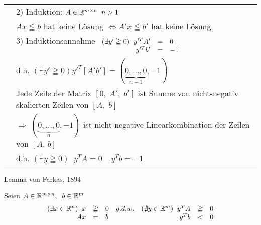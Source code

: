 \begin{longtable}[l]{lp{13cm}}
&2) Induktion: $A \in \mathbb{R}^{m \times n} \; \; n > 1 $\\
& $A x \leqq b$ hat keine Lösung $\Leftrightarrow A'x \leqq b'$ hat keine Lösung\\
& 3) Induktionsannahme $\begin{array}[t]{rcl}(\exists y' \geqq 0) 
\; \; y'^{T}A' &=& 0\\ y'^{T}b'&=&-1\end{array}$\\
&d.h.  $(\exists y' \geqq 0) y'^{T} [A'b'] =
(\underbrace{0,\ldots,0}_{n-1},-1) $\\
&Jede Zeile der Matrix $[0,\;A',\;b']$ ist Summe von nicht-negativ skalierten
Zeilen von $[A,\; b]$\\
&$\Rightarrow \; (\underbrace{0,\ldots,0}_{n},-1)$ ist nicht-negative
Linearkombination der Zeilen von $[A, \, b]$\\
&d.h. $(\exists y \geqq 0) \;\; y^{T} A = 0\; \; \; \; y^{T}b = -1$
\end{longtable}

\begin{korollar}
Lemma von Farkas, 1894

Seien $A\in \mathbb{R}^{m\times n}, \; \; b \in \mathbb{R}^{m}$
\[\begin{array}{rcllrcl}
(\exists x \in \mathbb{R}^{n}) \; \; x &\geqq& 0 & g.d.w. & (\nexists y \in
\mathbb{R}^{m}) \; \; y^{T}A &\geqq& 0\\
A x&=&b&&y^{T}b &<& 0
\end{array}\]
\end{korollar}

